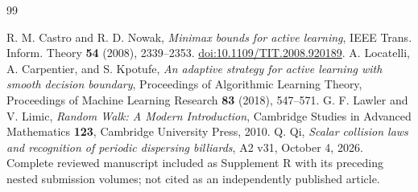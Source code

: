 \begin{thebibliography}{99}
\raggedright
{}
R. M. Castro and R. D. Nowak, \emph{Minimax bounds for active learning},
IEEE Trans. Inform. Theory \textbf{54} (2008), 2339--2353.
\href{https://doi.org/10.1109/TIT.2008.920189}{doi:10.1109/TIT.2008.920189}.
A. Locatelli, A. Carpentier, and S. Kpotufe,
\emph{An adaptive strategy for active learning with smooth decision boundary},
Proceedings of Algorithmic Learning Theory, Proceedings of Machine
Learning Research \textbf{83} (2018), 547--571.
G. F. Lawler and V. Limic, \emph{Random Walk: A Modern Introduction},
Cambridge Studies in Advanced Mathematics \textbf{123}, Cambridge
University Press, 2010.
Q. Qi, \emph{Scalar collision laws and recognition of periodic dispersing
billiards}, A2 v31, October 4, 2026. Complete reviewed manuscript included
as Supplement R with its preceding nested submission volumes; not cited
as an independently published article.
\end{thebibliography}
